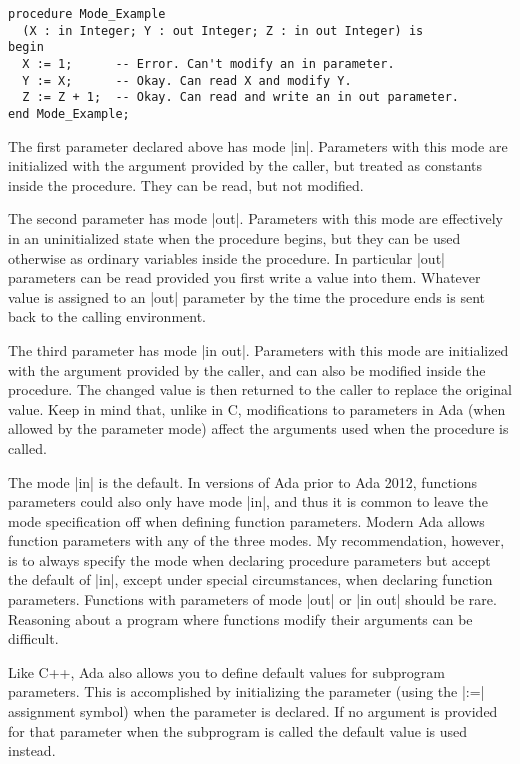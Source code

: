 \begin{lstlisting}
procedure Mode_Example
  (X : in Integer; Y : out Integer; Z : in out Integer) is
begin
  X := 1;      -- Error. Can't modify an in parameter.
  Y := X;      -- Okay. Can read X and modify Y.
  Z := Z + 1;  -- Okay. Can read and write an in out parameter.
end Mode_Example;
\end{lstlisting}

The first parameter declared above has mode |in|. Parameters with this mode are initialized with
the argument provided by the caller, but treated as constants inside the procedure. They can be
read, but not modified.

The second parameter has mode |out|. Parameters with this mode are effectively in an
uninitialized state when the procedure begins, but they can be used otherwise as ordinary
variables inside the procedure. In particular |out| parameters can be read provided you first
write a value into them. Whatever value is assigned to an |out| parameter by the time the
procedure ends is sent back to the calling environment.

The third parameter has mode |in out|. Parameters with this mode are initialized with the
argument provided by the caller, and can also be modified inside the procedure. The changed
value is then returned to the caller to replace the original value. Keep in mind that, unlike in
C, modifications to parameters in Ada (when allowed by the parameter mode) affect the arguments
used when the procedure is called.

The mode |in| is the default. In versions of Ada prior to Ada 2012, functions parameters could
also only have mode |in|, and thus it is common to leave the mode specification off when
defining function parameters. Modern Ada allows function parameters with any of the three modes.
My recommendation, however, is to always specify the mode when declaring procedure parameters
but accept the default of |in|, except under special circumstances, when declaring function
parameters. Functions with parameters of mode |out| or |in out| should be rare. Reasoning about
a program where functions modify their arguments can be difficult.

Like C++, Ada also allows you to define default values for subprogram parameters. This is
accomplished by initializing the parameter (using the |:=| assignment symbol) when the parameter
is declared. If no argument is provided for that parameter when the subprogram is called the
default value is used instead.

